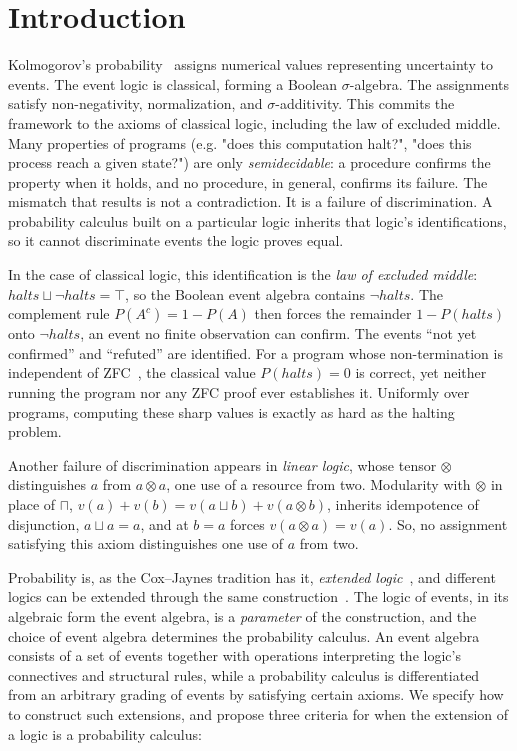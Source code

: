 \section{Introduction}
\label{sec:intro}


Kolmogorov's probability~\cite{kolmogorov1933} assigns numerical values representing 
uncertainty to events. The event logic is classical, forming a Boolean $\sigma$-algebra.
The assignments satisfy non-negativity, normalization, and $\sigma$-additivity. This commits 
the framework to the axioms of classical logic, including the law of excluded middle. Many 
properties of programs (e.g. "does this computation halt?", "does this process reach a given 
state?") are only \emph{semidecidable}: a procedure confirms the property when it holds, and 
no procedure, in general, confirms its failure.
The mismatch that results is not a contradiction. It is a failure of discrimination. 
A probability calculus built on a particular logic inherits that logic's identifications, so it 
cannot discriminate events the logic proves equal. 

In the case of classical logic, this identification is the \emph{law of excluded middle}:
$\mathit{halts} \sqcup \neg\mathit{halts} = \top$, so the Boolean event algebra contains 
$\neg\mathit{halts}$. The complement rule $P(A^{c}) = 1 - P(A)$ then forces 
the remainder $1 - P(\mathit{halts})$ onto $\neg\mathit{halts}$, an event no finite 
observation can confirm. The events ``not yet confirmed'' and ``refuted'' are identified.
For a program whose non-termination is independent of ZFC~\cite{yedidia-aaronson2016},
the classical value $P(\mathit{halts}) = 0$ is correct, yet neither running the program
nor any ZFC proof ever establishes it. Uniformly over programs, computing these sharp
values is exactly as hard as the halting problem. 

Another failure of discrimination appears in \emph{linear logic}, whose
tensor $\otimes$ distinguishes $a$ from $a \otimes a$, one use of a
resource from two. Modularity with $\otimes$ in place of $\sqcap$,
$v(a) + v(b) = v(a \sqcup b) + v(a \otimes b)$, inherits idempotence of
disjunction, $a \sqcup a = a$, and at $b = a$ forces
$v(a \otimes a) = v(a)$. So, no
assignment satisfying this axiom distinguishes one use of $a$ from two.

Probability is, as the Cox--Jaynes tradition has it, 
\emph{extended logic}~\cite{cox1946,jaynes2003}, and different logics can be extended 
through the same construction~\cite{paris2001,williams2012}. The logic of events, in its algebraic
form the event algebra, is a \emph{parameter} of the construction, and
the choice of event algebra determines the probability calculus.
An event algebra consists of a set of events together with operations 
interpreting the logic's connectives and structural rules, while a probability 
calculus is differentiated from an arbitrary grading of events by satisfying 
certain axioms. We specify how to construct such extensions, and
propose three criteria for when the extension of a logic is a probability
calculus:

